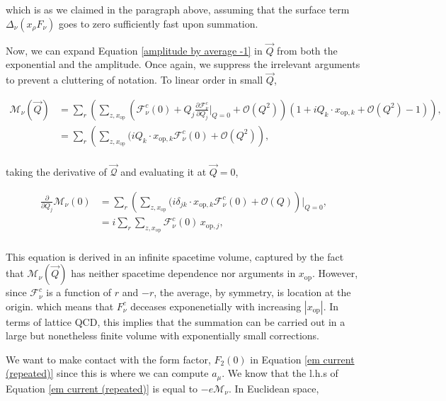 \documentclass{article}
\numberwithin{equation}{section} %
\begin{document}
\noindent which is as we claimed in the paragraph above, assuming that the surface term $\Delta_\nu(x_\rho F_\nu)$ goes to zero sufficiently fast upon summation.

Now, we can expand Equation \ref{amplitude by average -1} in $\vec{Q}$ from both the exponential and the amplitude. Once again, we suppress the irrelevant arguments to prevent a cluttering of notation. To linear order in small $\vec{Q}$, 

\begin{equation}
\begin{split}
\mathcal{M}_\nu(\vec{Q})&= \sum_r\left(\sum_{z,x_\mathrm{op}} (\mathcal{F}^c_\nu(0)+ Q_j\frac{\partial\mathcal{F}^c_\nu}{\partial Q_j}\bigg\vert_{Q=0}+ \mathcal{O}(Q^2))(1+iQ_k\cdot x_{\mathrm{op},k} + \mathcal{O}(Q^2)-1)\right),\\
&=\sum_r\left(\sum_{z,x_\mathrm{op}} (iQ_k\cdot x_{\mathrm{op},k}\mathcal{F}^c_\nu(0)+ \mathcal{O}(Q^2)\right),\\
\end{split}
\end{equation}

\noindent taking the derivative of $\mathcal{\vec{Q}}$ and evaluating it at $\vec{Q}=0$,

\begin{equation}
\begin{split}
\frac{\partial}{\partial Q_j}\mathcal{M}_\nu(0) &= \sum_r\left(\sum_{z,x_\mathrm{op}} (i\delta_{jk}\cdot x_{\mathrm{op},k}\mathcal{F}^c_\nu(0)+ \mathcal{O}(Q)\right)\bigg\vert_{Q=0},\\
&= i\sum_r\sum_{z,x_\mathrm{op}} \mathcal{F}^c_\nu(0) \, x_{\mathrm{op},j},\\
\end{split}
\label{moment hlbl}
\end{equation}

This equation is derived in an infinite spacetime volume, captured by the fact that $\mathcal{M}_\nu(\vec{Q})$ has neither spacetime dependence nor arguments in $x_\mathrm{op}$. However, since $\mathcal{F}^c_\nu$ is a function of $r$ and $-r$, the average, by symmetry, is location at the origin. which means that $F_\nu^c$ deceases exponenetially with increasing $|x_\mathrm{op}|$. In terms of lattice QCD, this implies that the summation can be carried out in a large but nonetheless finite volume with exponentially small corrections.

We want to make contact with the form factor, $F_2(0)$ in Equation \ref{em current (repeated)} since this is where we can compute $a_\mu$. We know that the l.h.s of Equation \ref{em current (repeated)} is equal to $-e\mathcal{M}_\nu$. In Euclidean space,
\end{document}
